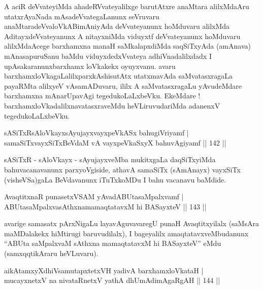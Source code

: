 \begin{artha}
A aciR deVvateyiMda ahadeRVvateyalilxge barutAtxre anaMtara alilxMdaAru utatxrAyaNada mAsadeVvategaLanunx seVruvaru anaMtaradeVvaloVkABimAniyAda deVvateyanunx hoMduvaru alilxMda AditayxdeVvateyanunx A nitayxniMda viduyxtf deVvateyanunx hoMduvaru alilxMdaAcege barxhamxna manaH saMkalapxdiMda saqSiTxyAda (amAnava) mAnasapuruSanu baMdu viduyxdedxVvateya adhiVnadalilxdadx I upAsakaranunxbarxhamx loVkakekx oyuyxvanu. avaru barxhamxloVkagaLalilxparxkAshisutAtx utatxmavAda saMvatasxragaLa payaRMta alilxyeV vAsamADuvaru, ililx A saMvatasxragaLu yAvudeMdare  barxhamxna mAnarUpavAgi tegedukoLaLxbeVku. EkeMdare ! barxhamxloVkadalilxnavatasxraveMdu heVLiruvudariMda adanenxV tegedukoLaLxbeVku.
\end{artha}


\begin{shl}
sASiTxRsAloVkayxsAyujayxvayxpeVkASx bahugiVriyamf | \\
samaSiTxvayxSiTxBeVdaM vA vayxpeVkaSxyX bahuvAgiyamf \hfill|| 142 || 
\end{shl}

\begin{artha}
sASiTxR - sAloVkayx - sAyujayxveMba mukitxgaLa daqSiTxyiMda
bahuvacanavanunx parxyoVgiside, athavA samaSiTx (sAmAnayx) vayxSiTx
(visheVSa)gaLa BeVdavanunx iTuTxkoMDu I bahu vacanavu baMdide.
\end{artha}


\begin{shl}
AvaqtitxnaR punasetxVSAM yAvadABUtasaMpalxvamf | \\
ABUtasaMpalxvasAthxnamamaqtatavxM hi BASayxteV \hfill|| 143 || 
\end{shl}

\begin{artha}
avarige samasatx pArxNigaLu layavAguvavaregU punaH Avaqtitxyilalx
(saMsAra maMDalakekx hiMtirugi baruvudilalx), I bageyalilx
amaqtatavxveMbudanunx ``ABUta saMpalxvaM sAthxna mamaqtatavxM
hi BASayxteV'' eMdu (samxqqtikAraru heVLuvaru).
\end{artha}


\begin{shl}
aikAtamxyXdhiVsamutapxtetxVH yadivA barxhamxloVkataH | \\
mucayxnetxV na nivataRnetxV yathA dhUmAdimAgaRgAH \hfill|| 144 || 
\end{shl}


